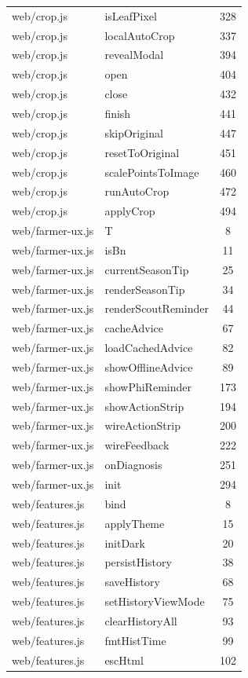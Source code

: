 \begin{center}
\begin{longtable}{@{}p{4.6cm}p{5.2cm}c@{}}
web/crop.js & isLeafPixel & 328 \\
web/crop.js & localAutoCrop & 337 \\
web/crop.js & revealModal & 394 \\
web/crop.js & open & 404 \\
web/crop.js & close & 432 \\
web/crop.js & finish & 441 \\
web/crop.js & skipOriginal & 447 \\
web/crop.js & resetToOriginal & 451 \\
web/crop.js & scalePointsToImage & 460 \\
web/crop.js & runAutoCrop & 472 \\
web/crop.js & applyCrop & 494 \\
web/farmer-ux.js & T & 8 \\
web/farmer-ux.js & isBn & 11 \\
web/farmer-ux.js & currentSeasonTip & 25 \\
web/farmer-ux.js & renderSeasonTip & 34 \\
web/farmer-ux.js & renderScoutReminder & 44 \\
web/farmer-ux.js & cacheAdvice & 67 \\
web/farmer-ux.js & loadCachedAdvice & 82 \\
web/farmer-ux.js & showOfflineAdvice & 89 \\
web/farmer-ux.js & showPhiReminder & 173 \\
web/farmer-ux.js & showActionStrip & 194 \\
web/farmer-ux.js & wireActionStrip & 200 \\
web/farmer-ux.js & wireFeedback & 222 \\
web/farmer-ux.js & onDiagnosis & 251 \\
web/farmer-ux.js & init & 294 \\
web/features.js & bind & 8 \\
web/features.js & applyTheme & 15 \\
web/features.js & initDark & 20 \\
web/features.js & persistHistory & 38 \\
web/features.js & saveHistory & 68 \\
web/features.js & setHistoryViewMode & 75 \\
web/features.js & clearHistoryAll & 93 \\
web/features.js & fmtHistTime & 99 \\
web/features.js & escHtml & 102 \\

\end{longtable}
\end{center}
